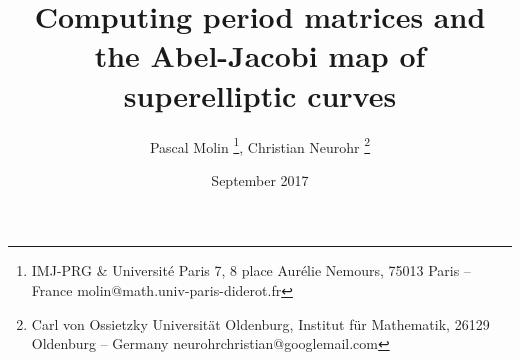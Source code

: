 \documentclass[10pt,a4paper]{article}
\title{Computing period matrices and the Abel-Jacobi map of superelliptic curves}
\author{%
    Pascal Molin
        \thanks{IMJ-PRG \& Université Paris 7,
        8 place Aurélie Nemours,
        75013 Paris -- France\newline
        molin@math.univ-paris-diderot.fr},
    Christian Neurohr%
        \thanks{Carl von Ossietzky Universität Oldenburg,
        Institut für Mathematik,
        26129 Oldenburg -- Germany\newline
        neurohrchristian@googlemail.com}}
\date{September 2017}
\def\biblio{}
\begin{document}
\def\biblio{}

\maketitle
























\end{document}

